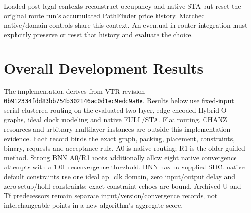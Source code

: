 \documentclass[conference,10pt]{IEEEtran}
\begin{document}
Loaded post-legal contexts reconstruct occupancy and native STA but reset the original route run's accumulated PathFinder price history. Matched native/domain controls share this context. An eventual in-router integration must explicitly preserve or reset that history and evaluate the choice.

\section{Overall Development Results}
The implementation derives from VTR revision \texttt{0b912334fdd83bb754b302146ac0d1ec9edc9a0e}. Results below use fixed-input serial clustered routing on the evaluated two-layer, edge-encoded Hybrid-O graphs, ideal clock modeling and native FULL/STA. Flat routing, CHANZ resources and arbitrary multilayer instances are outside this implementation evidence. Each record binds the exact graph, packing, placement, constraints, binary, requests and acceptance rule. A0 is native routing; R1 is the older guided method. Strong BNN A0/R1 roots additionally allow eight native convergence attempts with a 1.01 reconvergence threshold. BNN has no supplied SDC: native default constraints use one ideal ap\_clk domain, zero input/output delay and zero setup/hold constraints; exact constraint echoes are bound. Archived U and Tf predecessors remain separate input/version/convergence records, not interchangeable points in a new algorithm's aggregate score.
\end{document}
